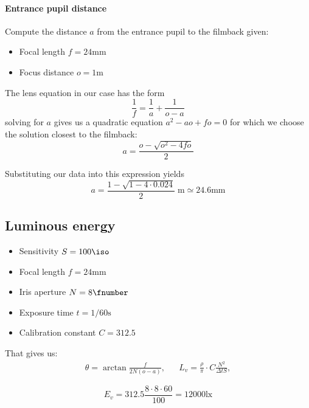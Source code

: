 \paragraph{Entrance pupil distance}

Compute the distance $a$ from the entrance pupil to the filmback given:
\begin{itemize}
\item Focal length $f = \num{24}\unit{\milli\meter}$
\item Focus distance $o = \num{1}\unit{\meter}$
\end{itemize}

The lens equation in our case has the form
\begin{displaymath}
\frac1f = \frac1a + \frac1{o - a}
\end{displaymath}
solving for $a$ gives us a quadratic equation $a^2 - a o + f o = 0$ for which we
choose the solution closest to the filmback:
\begin{displaymath}
a = \frac{o-\sqrt{o^2 - 4fo}}2
\end{displaymath}

Substituting our data into this expression yields
\begin{displaymath}
a = \frac{1-\sqrt{1 - 4 \cdot 0.024}}2 \;\unit{\meter} \simeq \num{24.6}\unit{\milli\meter}
\end{displaymath}

\ifomit
\subsection{Luminous energy}

\begin{itemize}
\item Sensitivity $S = \num{100}\unit{\iso}$
\item Focal length $f = \num{24}\unit{\milli\meter}$
\item Iris aperture $N = \num{8}\unit{\fnumber}$
\item Exposure time $t = 1/60\unit{\second}$
\item Calibration constant $C = 312.5$
\end{itemize}

That gives us:
\begin{align*}
\theta = \arctan\frac{f}{2N(o-a)}, && L_v = \frac{\rho}{\pi}\cdot
C\frac{N^2}{\Delta t S},
\end{align*}

\begin{displaymath}
E_v = 312.5\frac{8\cdot 8 \cdot 60}{100} = \num{12000}\unit{\lux}
\end{displaymath}


